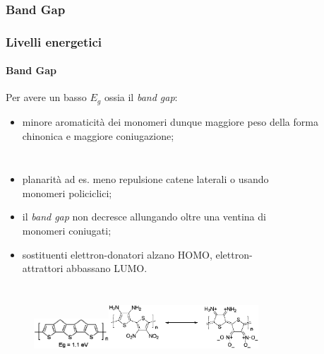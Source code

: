 \subsubsection{Band Gap}\begin{frame}\frametitle{Livelli energetici}\framesubtitle{Band Gap}

Per avere un basso $E_g$ ossia il \emph{band gap}:
\begin{itemize}
    \item minore aromaticità dei monomeri dunque maggiore peso della forma chinonica e maggiore coniugazione;
  \end{itemize} \begin{columns}
  \begin{itemize}\item planarità ad es. meno repulsione catene laterali o usando monomeri policiclici;
    \item il \emph{band gap} non decresce allungando oltre una ventina di monomeri coniugati;
    \item sostituenti elettron-donatori alzano HOMO, elettron-attrattori abbassano LUMO.
 \end{itemize}
\vspace{-20pt}\begin{figure}{}\end{figure}

\end{columns}\vspace{-10pt}\begin{figure}{\includegraphics[width=0.25\textwidth]{img/tiofeniplanari.png}\hspace{20pt}\includegraphics[width=0.5\textwidth]{img/dimero.png}}\end{figure}\end{frame}
